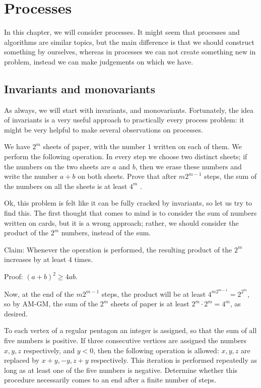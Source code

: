 \chapter{Processes}

In this chapter, we will consider processes. It might seem that processes and algorithms are similar topics, but the main difference is that we should construct something by ourselves, whereas in processes we can not create something new in problem, instead we can make judgements on which we have.

\section{Invariants and monovariants}

As always, we will start with invariants, and monovariants. Fortunately, the idea of invariants is a very useful approach to practically every process problem: it might be very helpful to make several observations on processes.

\begin{example} [ISL 2014]
We have $2^m$ sheets of paper, with the number $1$ written on each of them. We perform the following operation. In every step we choose two distinct sheets; if the numbers on the two sheets are $a$ and $b$, then we erase these numbers and write the number $a + b$ on both sheets. Prove that after $m2^{m -1}$ steps, the sum of the numbers on all the sheets is at least $4^m$ .
\end{example}

\sol 
Ok, this problem is felt like it can be fully cracked by invariants, so let us try to find this. The first thought that comes to mind is to consider the sum of numbers written on cards, but it is a wrong approach; rather, we should consider the product of the $2^m$ numbers, instead of the sum.

Claim: Whenever the operation is performed, the resulting product of the $2^m$ increases by at least $4$ times.

Proof: $(a+b)^2 \geq 4ab$.

Now, at the end of the $m2^{m-1}$ steps, the product will be at least $4^{m2^{m-1}} = 2^{2^m}$, so by AM-GM, the sum of the $2^m$ sheets of paper is at least $2^m \cdot 2^m = 4^m$, as desired.

\begin{example}[IMO 1986]
    To each vertex of a regular pentagon an integer is assigned, so that the sum of all five numbers is positive. If three consecutive vertices are assigned the numbers $x,y,z$ respectively, and $y<0$, then the following operation is allowed: $x,y,z$ are replaced by $x+y,-y,z+y$ respectively. This iteration is performed repeatedly as long as at least one of the five numbers is negative. Determine whether this procedure necessarily comes to an end after a finite number of steps.
\end{example}

